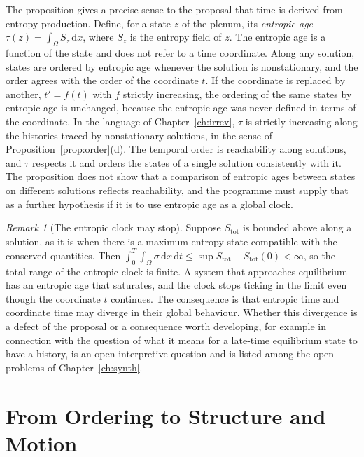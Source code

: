 \documentclass[11pt,twoside,openright]{book}
\theoremstyle{plain}
\theoremstyle{definition}
\theoremstyle{remark}
\newtheorem{remark}[theorem]{Remark}
\newcommand{\dd}{\,\mathrm{d}}
\begin{document}
The proposition gives a precise sense to the proposal that time is derived from entropy production. Define, for a state $z$ of the plenum, its \emph{entropic age} $\tau(z)=\int_\Omega S_z\dd x$, where $S_z$ is the entropy field of $z$. The entropic age is a function of the state and does not refer to a time coordinate. Along any solution, states are ordered by entropic age whenever the solution is nonstationary, and the order agrees with the order of the coordinate $t$. If the coordinate is replaced by another, $t'=f(t)$ with $f$ strictly increasing, the ordering of the same states by entropic age is unchanged, because the entropic age was never defined in terms of the coordinate. In the language of Chapter~\ref{ch:irrev}, $\tau$ is strictly increasing along the histories traced by nonstationary solutions, in the sense of Proposition~\ref{prop:order}(d). The temporal order is reachability along solutions, and $\tau$ respects it and orders the states of a single solution consistently with it. The proposition does not show that a comparison of entropic ages between states on different solutions reflects reachability, and the programme must supply that as a further hypothesis if it is to use entropic age as a global clock.

\begin{remark}[The entropic clock may stop]
Suppose $S_{\mathrm{tot}}$ is bounded above along a solution, as it is when there is a maximum-entropy state compatible with the conserved quantities. Then $\int_0^T\!\!\int_\Omega\sigma\dd x\dd t\le\sup S_{\mathrm{tot}}-S_{\mathrm{tot}}(0)<\infty$, so the total range of the entropic clock is finite. A system that approaches equilibrium has an entropic age that saturates, and the clock stops ticking in the limit even though the coordinate $t$ continues. The consequence is that entropic time and coordinate time may diverge in their global behaviour. Whether this divergence is a defect of the proposal or a consequence worth developing, for example in connection with the question of what it means for a late-time equilibrium state to have a history, is an open interpretive question and is listed among the open problems of Chapter~\ref{ch:synth}.
\end{remark}

\section{From Ordering to Structure and Motion}
\end{document}
